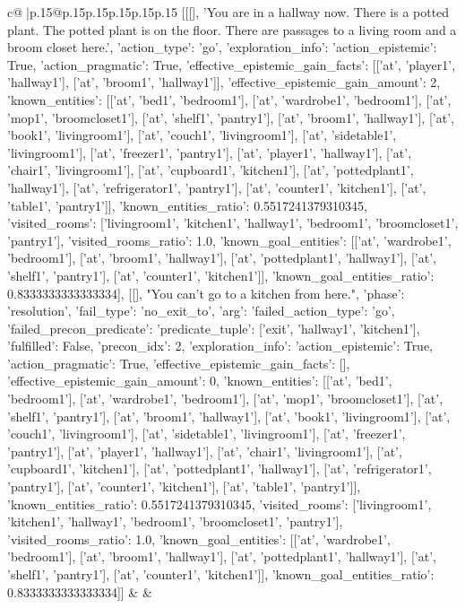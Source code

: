 \documentclass{article}
\begin{document}
{\begin{supertabular}{c@{$\;$}|p{.15\linewidth}@{}p{.15\linewidth}p{.15\linewidth}p{.15\linewidth}p{.15\linewidth}p{.15\linewidth}}
{{{	 [[[], 'You are in a hallway now. There is a potted plant. The potted plant is on the floor. There are passages to a living room and a broom closet here.', {'action_type': 'go', 'exploration_info': {'action_epistemic': True, 'action_pragmatic': True, 'effective_epistemic_gain_facts': [['at', 'player1', 'hallway1'], ['at', 'broom1', 'hallway1']], 'effective_epistemic_gain_amount': 2, 'known_entities': [['at', 'bed1', 'bedroom1'], ['at', 'wardrobe1', 'bedroom1'], ['at', 'mop1', 'broomcloset1'], ['at', 'shelf1', 'pantry1'], ['at', 'broom1', 'hallway1'], ['at', 'book1', 'livingroom1'], ['at', 'couch1', 'livingroom1'], ['at', 'sidetable1', 'livingroom1'], ['at', 'freezer1', 'pantry1'], ['at', 'player1', 'hallway1'], ['at', 'chair1', 'livingroom1'], ['at', 'cupboard1', 'kitchen1'], ['at', 'pottedplant1', 'hallway1'], ['at', 'refrigerator1', 'pantry1'], ['at', 'counter1', 'kitchen1'], ['at', 'table1', 'pantry1']], 'known_entities_ratio': 0.5517241379310345, 'visited_rooms': ['livingroom1', 'kitchen1', 'hallway1', 'bedroom1', 'broomcloset1', 'pantry1'], 'visited_rooms_ratio': 1.0, 'known_goal_entities': [['at', 'wardrobe1', 'bedroom1'], ['at', 'broom1', 'hallway1'], ['at', 'pottedplant1', 'hallway1'], ['at', 'shelf1', 'pantry1'], ['at', 'counter1', 'kitchen1']], 'known_goal_entities_ratio': 0.8333333333333334}}], [[], "You can't go to a kitchen from here.", {'phase': 'resolution', 'fail_type': 'no_exit_to', 'arg': {'failed_action_type': 'go', 'failed_precon_predicate': {'predicate_tuple': ['exit', 'hallway1', 'kitchen1'], 'fulfilled': False, 'precon_idx': 2}}, 'exploration_info': {'action_epistemic': True, 'action_pragmatic': True, 'effective_epistemic_gain_facts': [], 'effective_epistemic_gain_amount': 0, 'known_entities': [['at', 'bed1', 'bedroom1'], ['at', 'wardrobe1', 'bedroom1'], ['at', 'mop1', 'broomcloset1'], ['at', 'shelf1', 'pantry1'], ['at', 'broom1', 'hallway1'], ['at', 'book1', 'livingroom1'], ['at', 'couch1', 'livingroom1'], ['at', 'sidetable1', 'livingroom1'], ['at', 'freezer1', 'pantry1'], ['at', 'player1', 'hallway1'], ['at', 'chair1', 'livingroom1'], ['at', 'cupboard1', 'kitchen1'], ['at', 'pottedplant1', 'hallway1'], ['at', 'refrigerator1', 'pantry1'], ['at', 'counter1', 'kitchen1'], ['at', 'table1', 'pantry1']], 'known_entities_ratio': 0.5517241379310345, 'visited_rooms': ['livingroom1', 'kitchen1', 'hallway1', 'bedroom1', 'broomcloset1', 'pantry1'], 'visited_rooms_ratio': 1.0, 'known_goal_entities': [['at', 'wardrobe1', 'bedroom1'], ['at', 'broom1', 'hallway1'], ['at', 'pottedplant1', 'hallway1'], ['at', 'shelf1', 'pantry1'], ['at', 'counter1', 'kitchen1']], 'known_goal_entities_ratio': 0.8333333333333334}}]] 
	  } 
	   } 
	   } 
	 & & \\ 
 


\end{supertabular}}
\end{document}
